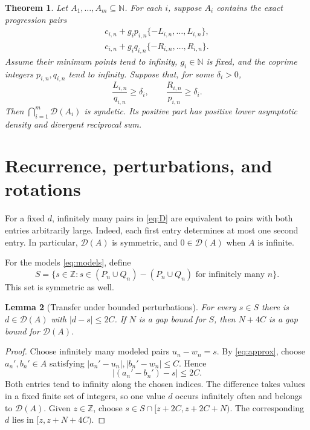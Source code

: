 \documentclass[11pt,leqno]{amsart}
\numberwithin{equation}{section}
\newtheorem{theorem}{Theorem}[section]
\newtheorem{lemma}[theorem]{Lemma}
\theoremstyle{definition}
\theoremstyle{remark}
\newcommand{\N}{\mathbb N}
\newcommand{\Z}{\mathbb Z}
\newcommand{\D}{\mathcal D}
\begin{document}
\begin{theorem}\label{thm:family}
Let $A_1,\ldots,A_m\subseteq\N$. For each $i$, suppose $A_i$ contains the exact progression pairs
\begin{equation}\label{eq:centered}
\begin{split}
c_{i,n}+g_ip_{i,n}\{-L_{i,n},\ldots,L_{i,n}\},\\
c_{i,n}+g_iq_{i,n}\{-R_{i,n},\ldots,R_{i,n}\}.
\end{split}
\end{equation}
Assume their minimum points tend to infinity, $g_i\in\N$ is fixed, and the coprime integers $p_{i,n},q_{i,n}$ tend to infinity. Suppose that, for some $\delta_i>0$,
\begin{equation}\label{eq:centered-lengths}
\frac{L_{i,n}}{q_{i,n}}\ge\delta_i,
\qquad
\frac{R_{i,n}}{p_{i,n}}\ge\delta_i.
\end{equation}
Then $\bigcap_{i=1}^m\D(A_i)$ is syndetic. Its positive part has positive lower asymptotic density and divergent reciprocal sum.
\end{theorem}

\section{Recurrence, perturbations, and rotations}

For a fixed $d$, infinitely many pairs in \eqref{eq:D} are equivalent to pairs with both entries arbitrarily large. Indeed, each first entry determines at most one second entry. In particular, $\D(A)$ is symmetric, and $0\in\D(A)$ when $A$ is infinite.

For the models \eqref{eq:models}, define
\begin{equation}\label{eq:S}
S=\{s\in\Z:s\in(P_n\cup Q_n)-(P_n\cup Q_n)
\text{ for infinitely many }n\}.
\end{equation}
This set is symmetric as well.

\begin{lemma}[Transfer under bounded perturbations]\label{lem:transfer}
For every $s\in S$ there is $d\in\D(A)$ with $|d-s|\le2C$. If $N$ is a gap bound for $S$, then $N+4C$ is a gap bound for $\D(A)$.
\end{lemma}
\begin{proof}
Choose infinitely many modeled pairs $u_n-w_n=s$. By \eqref{eq:approx}, choose $a_n',b_n'\in A$ satisfying $|a_n'-u_n|,|b_n'-w_n|\le C$. Hence
\[
|(a_n'-b_n')-s|\le2C.
\]
Both entries tend to infinity along the chosen indices. The difference takes values in a fixed finite set of integers, so one value $d$ occurs infinitely often and belongs to $\D(A)$. Given $z\in\Z$, choose $s\in S\cap[z+2C,z+2C+N)$. The corresponding $d$ lies in $[z,z+N+4C)$.
\end{proof}
\end{document}

